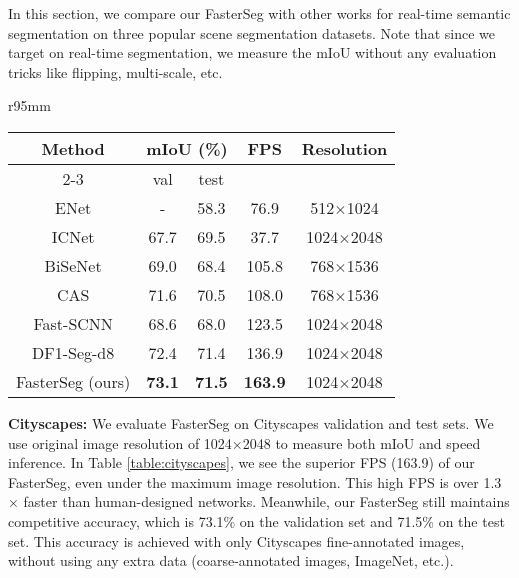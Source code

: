 \documentclass{article} \usepackage{iclr2020_conference,times}
\begin{document}
In this section, we compare our FasterSeg with other works for real-time semantic segmentation on three popular scene segmentation datasets. Note that since we target on real-time segmentation, we measure the mIoU without any evaluation tricks like flipping, multi-scale, etc.

\begin{wraptable}{r}{95mm}
\vspace{-1.5em}
\footnotesize
\begin{center}
\caption{mIoU and inference FPS on Ciytscapes validation and test sets.}
\begin{tabular}{ccccc}
\toprule
\multirow{2}{*}{Method} & \multicolumn{2}{c}{mIoU (\%)} & \multirow{2}{*}{FPS} & \multirow{2}{*}{Resolution} \\ \cmidrule{2-3}
 & val & test &  \\ \midrule
ENet \citep{paszke2016enet} & - & 58.3 & 76.9 & 512$\times$1024\\
ICNet \citep{zhao2018icnet} & 67.7 & 69.5 & 37.7 & 1024$\times$2048 \\
BiSeNet \citep{yu2018bisenet} & 69.0 & 68.4 & 105.8 & 768$\times$1536 \\
CAS \citep{zhang2019customizable} & 71.6 & 70.5 & 108.0 & 768$\times$1536 \\
Fast-SCNN \citep{poudel2019fast} & 68.6 & 68.0 & 123.5 & 1024$\times$2048\\
DF1-Seg-d8 \citep{li2019partial} & 72.4 & 71.4 & 136.9 & 1024$\times$2048 \\
FasterSeg (ours) & \textbf{73.1} & \textbf{71.5} & \textbf{163.9} & 1024$\times$2048 \\ \bottomrule
\end{tabular} \label{table:cityscapes}
\vspace{-1em}
\end{center}
\end{wraptable}

\textbf{Cityscapes:}
We evaluate FasterSeg on Cityscapes validation and test sets. We use original image resolution of 1024$\times$2048 to measure both mIoU and speed inference. In Table \ref{table:cityscapes}, we see the superior FPS (163.9) of our FasterSeg, even under the maximum image resolution. This high FPS is over 1.3$\times$ faster than human-designed networks. Meanwhile, our FasterSeg still maintains competitive accuracy, which is 73.1\% on the validation set and 71.5\% on the test set. This accuracy is achieved with only Cityscapes fine-annotated images, without using any extra data (coarse-annotated images, ImageNet, etc.).
\end{document}
